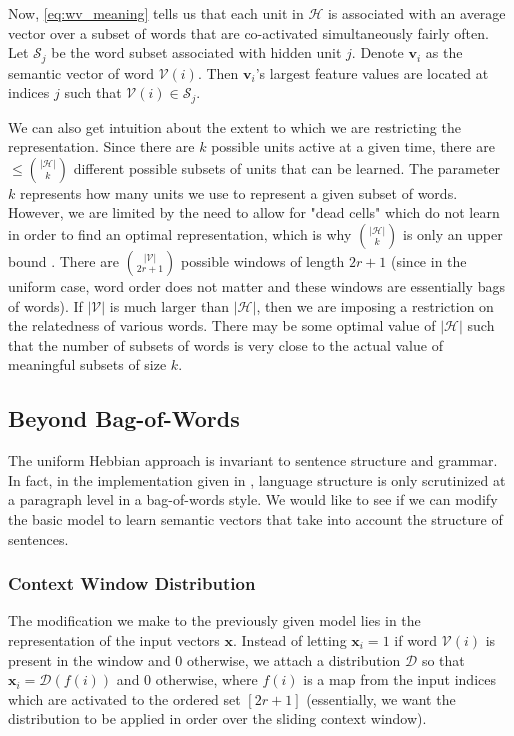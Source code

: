 \documentclass[12pt, usenames]{article}
\theoremstyle{definition}
\theoremstyle{definition}
\theoremstyle{definition}
\newcommand{\mc}[1]
{\mathcal{#1}}
\newcommand{\vv}[1]
{\textbf{#1}}
\begin{document}
Now, \autoref{eq:wv_meaning} tells us that each unit in $\mc{H}$ is associated with an average vector over a subset of words that are co-activated simultaneously fairly often. Let $\mc{S}_j$ be the word subset associated with hidden unit $j$. Denote $\vv{v}_i$ as the semantic vector of word $\mc{V}(i)$. Then $\vv{v}_i$'s largest feature values are located at indices $j$ such that $\mc{V}(i) \in \mc{S}_j$.

We can also get intuition about the extent to which we are restricting the representation. Since there are $k$ possible units active at a given time, there are $\leq {|\mc{H}| \choose k}$ different possible subsets of units that can be learned. The parameter $k$ represents how many units we use to represent a given subset of words. However, we are limited by the need to allow for "dead cells" which do not learn in order to find an optimal representation, which is why ${|\mc{H}| \choose k}$ is only an upper bound \cite{OReilly}. There are ${|\mc{V}| \choose 2r + 1}$ possible windows of length $2r + 1$ (since in the uniform case, word order does not matter and these windows are essentially bags of words). If $|\mc{V}|$ is much larger than $|\mc{H}|$, then we are imposing a restriction on the relatedness of various words. There may be some optimal value of $|\mc{H}|$ such that the number of subsets of words is very close to the actual value of meaningful subsets of size $k$.

\subsection{Beyond Bag-of-Words}

The uniform Hebbian approach is invariant to sentence structure and grammar. In fact, in the implementation given in \cite{OReillyBook}, language structure is only scrutinized at a paragraph level in a bag-of-words style. We would like to see if we can modify the basic model to learn semantic vectors that take into account the structure of sentences.

\subsubsection{Context Window Distribution}
The modification we make to the previously given model lies in the representation of the input vectors $\vv{x}$. Instead of letting $\vv{x}_i = 1$ if word $\mc{V}(i)$ is present in the window and $0$ otherwise, we attach a distribution $\mc{D}$ so that $\vv{x}_i = \mc{D}(f(i))$ and $0$ otherwise, where $f(i)$ is a map from the input indices which are activated to the ordered set $[2r + 1]$ (essentially, we want the distribution to be applied in order over the sliding context window). 
\end{document}
